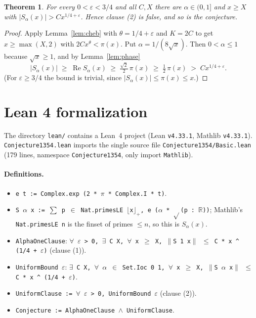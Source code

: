 \documentclass[11pt]{article}
\newtheorem{theorem}{Theorem}
\theoremstyle{definition}
\theoremstyle{remark}
\renewcommand{\_}{\oldus\allowbreak}
\begin{document}
\begin{theorem}\label{thm:main}
For every $0<\varepsilon<3/4$ and all $C, X$ there are $\alpha\in(0,1]$ and $x\ge X$ with
$|S_\alpha(x)| > C x^{1/4+\varepsilon}$. Hence clause (2) is false, and so is the conjecture.
\end{theorem}

\begin{proof}
Apply Lemma~\ref{lem:cheb} with $\theta = 1/4+\varepsilon$ and $K = 2C$ to get $x \ge \max(X,2)$ with
$2Cx^\theta < \pi(x)$. Put $\alpha = 1/(8\sqrt x)$. Then $0<\alpha\le 1$ because $\sqrt x\ge1$, and by
Lemma~\ref{lem:phase}
\[
 |S_\alpha(x)| \;\ge\; \operatorname{Re}S_\alpha(x) \;\ge\; \tfrac{\sqrt2}{2}\,\pi(x)
 \;\ge\; \tfrac12\,\pi(x) \;>\; C x^{1/4+\varepsilon}.
\]
(For $\varepsilon \ge 3/4$ the bound is trivial, since $|S_\alpha(x)| \le \pi(x) \le x$.)
\end{proof}

\section{Lean 4 formalization}\label{sec:lean}

The directory \texttt{lean/} contains a Lean~4 project (Lean \texttt{v4.33.1}, Mathlib \texttt{v4.33.1}).
\texttt{Conjecture1354.lean} imports the single source file \texttt{Conjecture1354/Basic.lean}
(179 lines, namespace \texttt{Conjecture1354}, only import \texttt{Mathlib}).

\paragraph{Definitions.}
\begin{itemize}
\item \texttt{e t := Complex.exp (2 * $\pi$ * Complex.I * t)}.
\item \texttt{S $\alpha$ x := $\sum$ p $\in$ Nat.primesLE $\lfloor$x$\rfloor_+$, e ($\alpha$ * $\sqrt{}$(p : $\mathbb{R}$))};
  Mathlib's \texttt{Nat.primesLE n} is the finset of primes $\le n$, so this is $S_\alpha(x)$.
\item \texttt{AlphaOneClause}: \texttt{$\forall$ $\varepsilon$ > 0, $\exists$ C X, $\forall$ x $\ge$ X,
  $\|$S 1 x$\|$ $\le$ C * x \^{} (1/4 + $\varepsilon$)} (clause (1)).
\item \texttt{UniformBound $\varepsilon$}: \texttt{$\exists$ C X, $\forall$ $\alpha$ $\in$ Set.Ioc 0 1,
  $\forall$ x $\ge$ X, $\|$S $\alpha$ x$\|$ $\le$ C * x \^{} (1/4 + $\varepsilon$)}.
\item \texttt{UniformClause := $\forall$ $\varepsilon$ > 0, UniformBound $\varepsilon$} (clause (2)).
\item \texttt{Conjecture := AlphaOneClause $\wedge$ UniformClause}.
\end{itemize}
\end{document}
